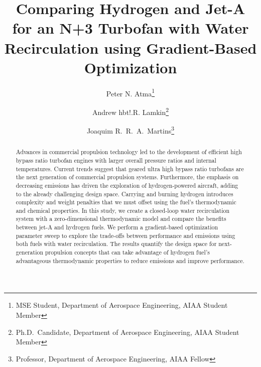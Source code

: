 \documentclass[conf]{new-aiaa}
\title{Comparing Hydrogen and Jet-A for an N+3 Turbofan with Water Recirculation using Gradient-Based Optimization} %
\author{Peter N. Atma\footnote{MSE Student, Department of Aerospace Engineering, AIAA Student Member}}
\author{Andrew hbt!.R. Lamkin\footnote{Ph.D.~Candidate, Department of Aerospace Engineering, AIAA Student Member}}
\author{Joaquim R.~R.~A.~Martins\footnote{Professor, Department of Aerospace Engineering, AIAA Fellow}}
\affil{University of Michigan, Ann Arbor, MI, 48109}
\begin{document}
\maketitle

\begin{abstract}
  Advances in commercial propulsion technology led to the development of efficient high bypass ratio turbofan engines with larger overall pressure ratios and internal temperatures.
  Current trends suggest that geared ultra high bypass ratio turbofans are the next generation of commercial propulsion systems.
  Furthermore, the emphasis on decreasing emissions has driven the exploration of hydrogen-powered aircraft, adding to the already challenging design space.
  Carrying and burning hydrogen introduces complexity and weight penalties that we must offset using the fuel's thermodynamic and chemical properties.
  In this study, we create a closed-loop water recirculation system with a zero-dimensional thermodynamic model and compare the benefits between jet-A and hydrogen fuels.
  We perform a gradient-based optimization parameter sweep to explore the trade-offs between performance and emissions using both fuels with water recirculation.
  The results quantify the design space for next-generation propulsion concepts that can take advantage of hydrogen fuel's advantageous thermodynamic properties to reduce emissions and improve performance.
\end{abstract}
\end{document}
